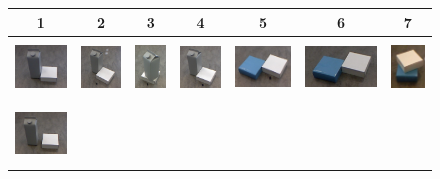 \begin{figure}[h!]  %
  \centering 

    \begin{tabular}{ccccccc}
      \hline
      1 & 2 & 3 & 4 & 5 & 6 & 7 \\
      \hline
      \hline
    \includegraphics[height=1.5cm]{pictures/11.jpg}&
    \includegraphics[height=1.5cm]{pictures/21.jpg}&
    \includegraphics[height=1.5cm]{pictures/31.jpg}&
    \includegraphics[height=1.5cm]{pictures/41.jpg}&
    \includegraphics[height=1.5cm]{pictures/51.jpg}&
    \includegraphics[height=1.5cm]{pictures/61.jpg}&
    \includegraphics[height=1.5cm]{pictures/71.jpg}\\
    \includegraphics[height=1.5cm]{pictures/12.jpg}&

\end{tabular}
\end{figure}
